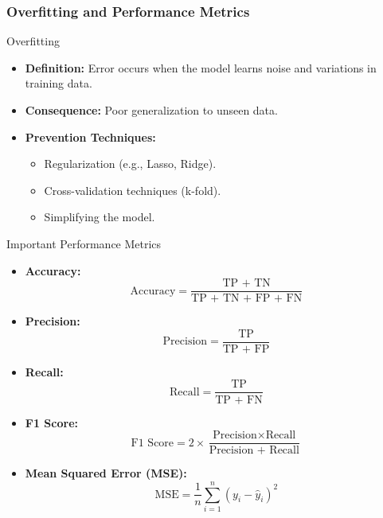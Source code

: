 \documentclass[aspectratio=169]{beamer}
\begin{document}
\begin{frame}[fragile]
    \frametitle{Overfitting and Performance Metrics}
    \begin{block}{Overfitting}
        \begin{itemize}
            \item \textbf{Definition:} Error occurs when the model learns noise and variations in training data.
            \item \textbf{Consequence:} Poor generalization to unseen data.
            \item \textbf{Prevention Techniques:}
                \begin{itemize}
                    \item Regularization (e.g., Lasso, Ridge).
                    \item Cross-validation techniques (k-fold).
                    \item Simplifying the model.
                \end{itemize}
        \end{itemize}
    \end{block}

    \begin{block}{Important Performance Metrics}
        \begin{itemize}
            \item \textbf{Accuracy:} 
                \begin{equation}
                    \text{Accuracy} = \frac{\text{TP + TN}}{\text{TP + TN + FP + FN}} 
                \end{equation}
            \item \textbf{Precision:} 
                \begin{equation}
                    \text{Precision} = \frac{\text{TP}}{\text{TP + FP}}
                \end{equation}
            \item \textbf{Recall:} 
                \begin{equation}
                    \text{Recall} = \frac{\text{TP}}{\text{TP + FN}}
                \end{equation}
            \item \textbf{F1 Score:} 
                \begin{equation}
                    \text{F1 Score} = 2 \times \frac{\text{Precision} \times \text{Recall}}{\text{Precision + Recall}}
                \end{equation}
            \item \textbf{Mean Squared Error (MSE):} 
                \begin{equation}
                    \text{MSE} = \frac{1}{n} \sum_{i=1}^{n} (y_i - \hat{y}_i)^2
                \end{equation}
        \end{itemize}
    \end{block}
\end{frame}
\end{document}
